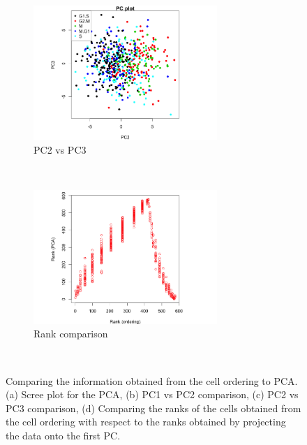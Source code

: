 \documentclass[11pt]{article}
\begin{document}
\begin{figure}[ht]
     \begin{subfigure}[t]{0.5\textwidth}
        \centering
        \includegraphics[height=2in]{../figures/cell_order_R_figs/PC_plot_23.png}
        \caption{PC2 vs PC3}
    \end{subfigure}%
    ~
    \begin{subfigure}[t]{0.5\textwidth}
        \centering
        \includegraphics[height=2in]{../figures/cell_order_R_figs/pca_cellorder_rank_compare.png}
        \caption{Rank comparison}
    \end{subfigure}\\
  \caption{Comparing the information obtained from the cell ordering to PCA. (a) Scree plot  for the PCA, (b) PC1 vs PC2 comparison,
  (c) PC2 vs PC3 comparison, (d) Comparing the ranks of the cells obtained from the cell ordering with respect to the ranks obtained by projecting the data onto the first PC.}
 \label{fig:fig6}
 \end{figure}   
 
\end{document}
